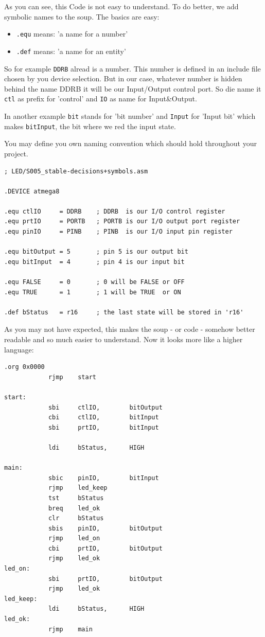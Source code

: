 As you can see, this Code is not easy to understand. To do better, we add symbolic names to the soup. The basics are easy:

\begin{itemize}
  \item \texttt{.equ} means: 'a name for a number'
  \item \texttt{.def} means: 'a name for an entity'
\end{itemize}

So for example \texttt{DDRB} alread is a number. This number is defined in an include file chosen by you device selection. But in our case, whatever number is hidden behind the name DDRB it will be our Input/Output control port. So die name it \texttt{ctl} as prefix for 'control' and \texttt{IO} as name for Input\&Output.

In another example \texttt{bit} stands for 'bit number' and \texttt{Input} for 'Input bit' which makes \texttt{bitInput}, the bit where we red the input state.

You may define you own naming convention which should hold throughout your project.

\begin{lstlisting}
; LED/S005_stable-decisions+symbols.asm

.DEVICE atmega8

.equ ctlIO     = DDRB    ; DDRB  is our I/O control register
.equ prtIO     = PORTB   ; PORTB is our I/O output port register
.equ pinIO     = PINB    ; PINB  is our I/O input pin register

.equ bitOutput = 5       ; pin 5 is our output bit
.equ bitInput  = 4       ; pin 4 is our input bit

.equ FALSE     = 0       ; 0 will be FALSE or OFF
.equ TRUE      = 1       ; 1 will be TRUE  or ON

.def bStatus   = r16     ; the last state will be stored in 'r16'
\end{lstlisting}

As you may not have expected, this makes the soup - or code - somehow better readable and so much easier to understand. Now it looks more like a higher language:

\begin{lstlisting}
.org 0x0000
            rjmp    start

start:
            sbi     ctlIO,        bitOutput
            cbi     ctlIO,        bitInput
            sbi     prtIO,        bitInput

            ldi     bStatus,      HIGH

main:
            sbic    pinIO,        bitInput
            rjmp    led_keep
            tst     bStatus
            breq    led_ok
            clr     bStatus
            sbis    pinIO,        bitOutput
            rjmp    led_on
            cbi     prtIO,        bitOutput
            rjmp    led_ok
led_on:
            sbi     prtIO,        bitOutput
            rjmp    led_ok
led_keep:
            ldi     bStatus,      HIGH
led_ok:
            rjmp    main
\end{lstlisting}

